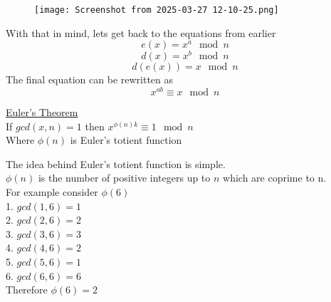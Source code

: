 \documentclass[aspectratio=169]{beamer}
\begin{document}
\begin{frame}
\begin{figure}
    \centering
    \texttt{[image: Screenshot from 2025-03-27 12-10-25.png]}
    \label{fig:enter-label}
\end{figure}
\end{frame}

\begin{frame}
    \begin{center}
        With that in mind, lets get back to the equations from earlier
        \[e(x) = x^a \mod n\]
        \[d(x) = x^b \mod n\]
        \[d(e(x)) = x \mod n\]
        The final equation can be rewritten as
        \[x^{ab} \equiv x \mod n\]
    \end{center}
\end{frame}

\begin{frame}
    \begin{center}
        \underline{Euler's Theorem}\\
        \vspace{5mm}
        If $gcd(x, n) = 1$ then $x^{\phi(n)k} \equiv 1 \mod n$\\
        Where $\phi(n)$ is Euler's totient function
    \end{center}
\end{frame}

\begin{frame}
    \begin{center}
        The idea behind Euler's totient function is simple.\\
        $\phi(n)$ is the number of positive integers up to $n$ which are coprime to n.\\
        \vspace{5mm}
        For example consider $\phi(6)$\\
        1. $gcd(1,6) = 1$ \checkmark \\
        2. $gcd(2, 6) = 2$ \\
        3. $gcd(3, 6) = 3$ \\
        4. $gcd(4, 6) = 2$ \\
        5. $gcd(5, 6) = 1$ \checkmark \\
        6. $gcd(6, 6) = 6$ \\
        \vspace{5mm}
        Therefore $\phi(6) = 2$
    \end{center}
\end{frame}
\end{document}
